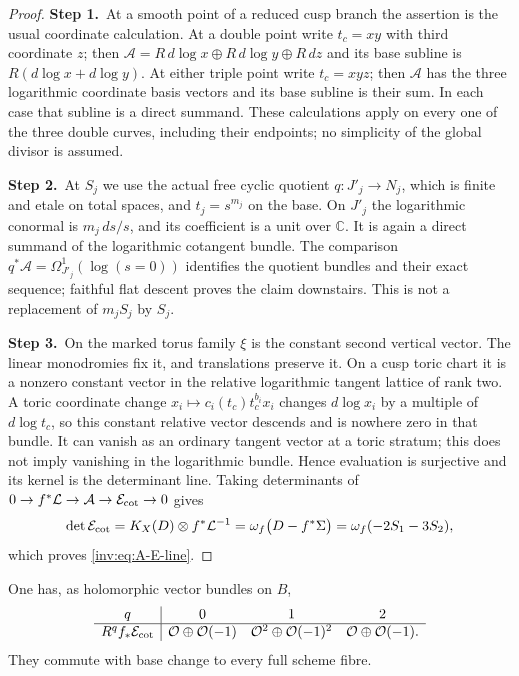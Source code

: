 \begin{proof}
\par\smallskip\noindent\textbf{Step 1.}\ At a smooth point of a reduced cusp branch the assertion is the usual
coordinate calculation.  At a double point write $t_c=xy$ with third
coordinate $z$; then
$\mathcal A=R\,d\log x\oplus R\,d\log y\oplus R\,dz$ and its
base subline is $R(d\log x+d\log y)$.  At either triple point write
$t_c=xyz$; then $\mathcal A$ has the three logarithmic coordinate
basis vectors and its base subline is their sum.  In each case that
subline is a direct summand.  These calculations apply on every one
of the three double curves, including their endpoints; no simplicity
of the global divisor is assumed.

\par\smallskip\noindent\textbf{Step 2.}\ At $S_j$ we use the actual free cyclic quotient
$q:J'_j\to N_j$, which is finite and etale on total spaces, and
$t_j=s^{m_j}$ on the base.  On $J'_j$ the logarithmic conormal is
$m_j\,ds/s$, and its coefficient is a unit over $\mathbb C$.  It is again a
direct summand of the logarithmic cotangent bundle.  The comparison
$q^*\mathcal A=\Omega_{J'_j}^1(\log(s=0))$ identifies the quotient
bundles and their exact sequence; faithful flat descent proves the
claim downstairs.  This is not a replacement of $m_jS_j$ by $S_j$.

\par\smallskip\noindent\textbf{Step 3.}\ On the marked torus family $\xi$ is the constant second vertical
vector.  The linear monodromies fix it, and translations preserve it.
On a cusp toric chart it is a nonzero constant vector in the relative
logarithmic tangent lattice of rank two.  A toric coordinate change
$x_i\mapsto c_i(t_c)t_c^{b_i}x_i$ changes $d\log x_i$ by a multiple
of $d\log t_c$, so this constant relative vector descends and is
nowhere zero in that bundle.  It can vanish as an ordinary tangent
vector at a toric stratum; this does not imply vanishing in the
logarithmic bundle.  Hence evaluation is surjective and its kernel
is the determinant line.  Taking determinants of
$0\to f^*\mathcal L\to\mathcal A\to\mathcal E_{\rm cot}\to0$ gives
\[
\det\mathcal E_{\rm cot}=K_X(D)\otimes f^*\mathcal L^{-1}
=\omega_f\bigl(D-f^*\Sigma\bigr)
=\omega_f(-2S_1-3S_2),
\]
which proves \eqref{inv:eq:A-E-line}.
\end{proof}

\begin{proposition}\label{inv:A1.2}
One has, as holomorphic vector bundles on $B$,
\[
\begin{array}{c|ccc}
q&0&1&2\\\hline
R^qf_*\mathcal E_{\rm cot}&\mathcal O\oplus\mathcal O(-1)&
 \mathcal O^2\oplus\mathcal O(-1)^2&\mathcal O\oplus\mathcal O(-1).
\end{array}
\]
They commute with base change to every full scheme fibre.
\end{proposition}

